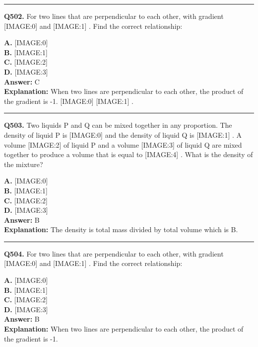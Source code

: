 \documentclass[12pt]{article}
\begin{document}
\hrule
\vspace{1em}


\noindent
\textbf{Q502.} For two lines that are perpendicular to each other, with gradient
[IMAGE:0]
and
[IMAGE:1]
.
Find the correct relationship:



\textbf{A.} [IMAGE:0] \\
\textbf{B.} [IMAGE:1] \\
\textbf{C.} [IMAGE:2] \\
\textbf{D.} [IMAGE:3] \\

\textbf{Answer:} C \\
\textbf{Explanation:} When two lines are perpendicular to each other, the product of the gradient is -1.
[IMAGE:0]
[IMAGE:1]
.

\hrule
\vspace{1em}


\noindent
\textbf{Q503.} Two liquids P and Q can be mixed together in any proportion. The density of liquid P is
[IMAGE:0]
and the density of liquid Q is
[IMAGE:1]
. A volume
[IMAGE:2]
of liquid P and a volume
[IMAGE:3]
of liquid Q are mixed together to produce a volume that is equal to
[IMAGE:4]
. What is the density of the mixture?



\textbf{A.} [IMAGE:0] \\
\textbf{B.} [IMAGE:1] \\
\textbf{C.} [IMAGE:2] \\
\textbf{D.} [IMAGE:3] \\

\textbf{Answer:} B \\
\textbf{Explanation:} The density is total mass divided by total volume which is B.

\hrule
\vspace{1em}


\noindent
\textbf{Q504.} For two lines that are perpendicular to each other, with gradient
[IMAGE:0]
and
[IMAGE:1]
.
Find the correct relationship:



\textbf{A.} [IMAGE:0] \\
\textbf{B.} [IMAGE:1] \\
\textbf{C.} [IMAGE:2] \\
\textbf{D.} [IMAGE:3] \\

\textbf{Answer:} B \\
\textbf{Explanation:} When two lines are perpendicular to each other, the product of the gradient is -1.
\end{document}
